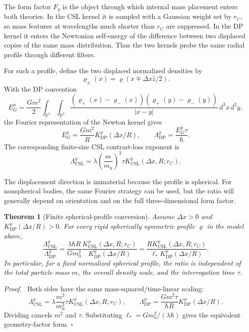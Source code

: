 \documentclass[
  aps,
  prd,
  preprint,
  notitlepage,
  superscriptaddress,
  nofootinbib,
  longbibliography
]{revtex4-2}
\newtheorem{theorem}{Theorem}
\newenvironment{proof}{\par\noindent\textit{Proof.}\ }{\hfill$\square$\par}
\newcommand{\amu}{m_{\mathrm u}}
\newcommand{\dx}{\Delta x}
\newcommand{\ellstar}{\ell_*}
\begin{document}
The form factor $F_\varrho$ is the object through which internal mass placement enters both theories. In the CSL kernel it is sampled with a Gaussian weight set by $r_C$, so mass features at wavelengths much shorter than $r_C$ are suppressed. In the DP kernel it enters the Newtonian self-energy of the difference between two displaced copies of the same mass distribution. Thus the two kernels probe the same radial profile through different filters.

For such a profile, define the two displaced normalized densities by
\[
\varrho_\pm(x)=\varrho(x\mp\dx\hat z/2).
\]
With the DP convention
\[
E_G^\varrho
=\frac{Gm^2}{2}\int_{\mathbb R^3}\!\int_{\mathbb R^3}
\frac{(\varrho_+(x)-\varrho_-(x))(\varrho_+(y)-\varrho_-(y))}{|x-y|}
\,d^3x\,d^3y,
\]
the Fourier representation of the Newton kernel gives
\[
E_G^\varrho=\frac{Gm^2}{R}K_{\mathrm{DP}}^\varrho(\dx/R),
\qquad
\Lambda_{\mathrm{DP}}^\varrho=\frac{E_G^\varrho\tau}{\hbar}.
\]
The corresponding finite-size CSL contrast-loss exponent is
\[
\Lambda_{\mathrm{CSL}}^\varrho
=\lambda\left(\frac{m}{\amu}\right)^2\tau
K_{\mathrm{CSL}}^\varrho(\dx,R;r_C).
\]

The displacement direction is immaterial because the profile is spherical. For nonspherical bodies, the same Fourier strategy can be used, but the ratio will generally depend on orientation and on the full three-dimensional form factor.

\begin{theorem}[Finite spherical-profile conversion]
Assume $\dx>0$ and $K_{\mathrm{DP}}^\varrho(\dx/R)>0$. For every rigid spherically symmetric profile $\varrho$ in the model above,
\[
\frac{\Lambda_{\mathrm{CSL}}^\varrho}{\Lambda_{\mathrm{DP}}^\varrho}
=\frac{\lambda\hbar R}{G\amu^2}
\frac{K_{\mathrm{CSL}}^\varrho(\dx,R;r_C)}
{K_{\mathrm{DP}}^\varrho(\dx/R)}
=\frac{R K_{\mathrm{CSL}}^\varrho(\dx,R;r_C)}
{\ellstar K_{\mathrm{DP}}^\varrho(\dx/R)}.
\]
In particular, for a fixed normalized spherical profile, the ratio is independent of the total particle mass $m$, the overall density scale, and the interrogation time $\tau$.
\end{theorem}

\begin{proof}
Both sides have the same mass-squared/time-linear scaling:
\[
\Lambda_{\mathrm{CSL}}^\varrho
=\lambda\frac{m^2}{\amu^2}\tau K_{\mathrm{CSL}}^\varrho(\dx,R;r_C),
\qquad
\Lambda_{\mathrm{DP}}^\varrho
=\frac{Gm^2\tau}{\hbar R}K_{\mathrm{DP}}^\varrho(\dx/R).
\]
Dividing cancels $m^2$ and $\tau$. Substituting $\ellstar=G\amu^2/(\lambda\hbar)$ gives the equivalent geometry-factor form.
\end{proof}
\end{document}
